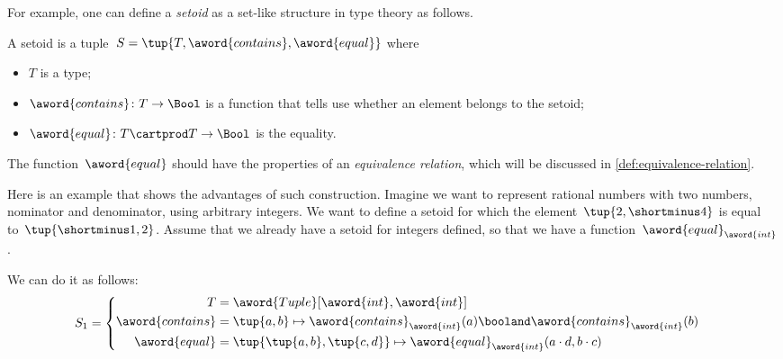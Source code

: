 For example, one can define a \emph{setoid} as a set-like structure in type theory as follows.

\begin{ctdefinition}[Setoid]
    A setoid is a tuple~$S = \tup{T, \aword{contains}, \aword{equal}}$ where
    \begin{itemize}
        \item $T$ is a type;
        \item $\aword{contains}\colon T\to\Bool$ is a function that tells use whether an element belongs to the setoid;
        \item $\aword{equal}\colon T\cartprod T\to\Bool$ is the equality.
    \end{itemize}
\end{ctdefinition}
The function~$\aword{equal}$ should have the properties of an \emph{equivalence relation},
which will be discussed in \cref{def:equivalence-relation}.

Here is an example that shows the advantages of such construction.
Imagine we want to represent rational numbers with two numbers, nominator and denominator, using arbitrary integers.
We want to define a setoid for which the element~$\tup{2, \shortminus 4}$ is equal to~$\tup{ \shortminus  1, 2}$.
Assume that we already have a setoid for integers defined, so that we have a function~$\aword{equal}_{\aword{int}}$.

We can do it as follows:
\begin{equation}
    S_1 =
    \begin{cases}
        \begin{aligned}
            T                & =
            \aword{Tuple}[\aword{int}, \aword{int}]
            \\
            \aword{contains} & = \tup{a,b} \mapsto \aword{contains}_{\aword{int}}(a)  \booland \aword{contains}_{\aword{int}}(b)
            \\
            \aword{equal}    & = \tup{\tup{a,b}, \tup{c,d}}
            \mapsto \aword{equal}_{\aword{int}} (a\cdot d, b\cdot c)
        \end{aligned}
    \end{cases}
\end{equation}


